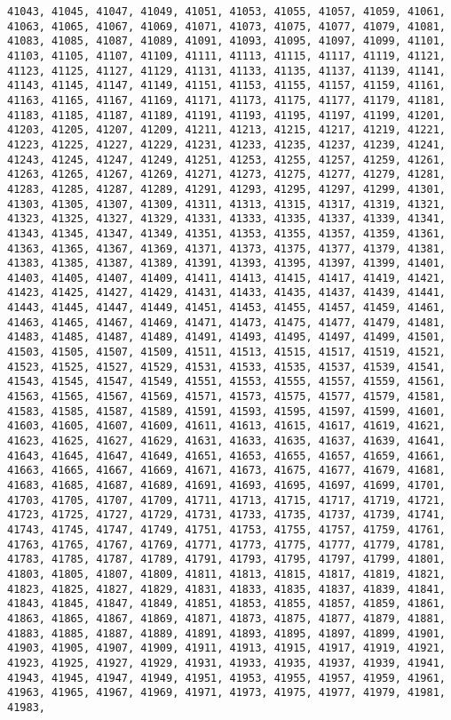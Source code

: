 \documentclass[11pt]{article}
\begin{document}
\begin{Verbatim}[commandchars=\\\{\}]
41043, 41045, 41047, 41049, 41051, 41053, 41055, 41057, 41059, 41061, 41063, 41065, 41067, 41069, 41071, 41073, 41075, 41077, 41079, 41081, 41083, 41085, 41087, 41089, 41091, 41093, 41095, 41097, 41099, 41101, 41103, 41105, 41107, 41109, 41111, 41113, 41115, 41117, 41119, 41121, 41123, 41125, 41127, 41129, 41131, 41133, 41135, 41137, 41139, 41141, 41143, 41145, 41147, 41149, 41151, 41153, 41155, 41157, 41159, 41161, 41163, 41165, 41167, 41169, 41171, 41173, 41175, 41177, 41179, 41181, 41183, 41185, 41187, 41189, 41191, 41193, 41195, 41197, 41199, 41201, 41203, 41205, 41207, 41209, 41211, 41213, 41215, 41217, 41219, 41221, 41223, 41225, 41227, 41229, 41231, 41233, 41235, 41237, 41239, 41241, 41243, 41245, 41247, 41249, 41251, 41253, 41255, 41257, 41259, 41261, 41263, 41265, 41267, 41269, 41271, 41273, 41275, 41277, 41279, 41281, 41283, 41285, 41287, 41289, 41291, 41293, 41295, 41297, 41299, 41301, 41303, 41305, 41307, 41309, 41311, 41313, 41315, 41317, 41319, 41321, 41323, 41325, 41327, 41329, 41331, 41333, 41335, 41337, 41339, 41341, 41343, 41345, 41347, 41349, 41351, 41353, 41355, 41357, 41359, 41361, 41363, 41365, 41367, 41369, 41371, 41373, 41375, 41377, 41379, 41381, 41383, 41385, 41387, 41389, 41391, 41393, 41395, 41397, 41399, 41401, 41403, 41405, 41407, 41409, 41411, 41413, 41415, 41417, 41419, 41421, 41423, 41425, 41427, 41429, 41431, 41433, 41435, 41437, 41439, 41441, 41443, 41445, 41447, 41449, 41451, 41453, 41455, 41457, 41459, 41461, 41463, 41465, 41467, 41469, 41471, 41473, 41475, 41477, 41479, 41481, 41483, 41485, 41487, 41489, 41491, 41493, 41495, 41497, 41499, 41501, 41503, 41505, 41507, 41509, 41511, 41513, 41515, 41517, 41519, 41521, 41523, 41525, 41527, 41529, 41531, 41533, 41535, 41537, 41539, 41541, 41543, 41545, 41547, 41549, 41551, 41553, 41555, 41557, 41559, 41561, 41563, 41565, 41567, 41569, 41571, 41573, 41575, 41577, 41579, 41581, 41583, 41585, 41587, 41589, 41591, 41593, 41595, 41597, 41599, 41601, 41603, 41605, 41607, 41609, 41611, 41613, 41615, 41617, 41619, 41621, 41623, 41625, 41627, 41629, 41631, 41633, 41635, 41637, 41639, 41641, 41643, 41645, 41647, 41649, 41651, 41653, 41655, 41657, 41659, 41661, 41663, 41665, 41667, 41669, 41671, 41673, 41675, 41677, 41679, 41681, 41683, 41685, 41687, 41689, 41691, 41693, 41695, 41697, 41699, 41701, 41703, 41705, 41707, 41709, 41711, 41713, 41715, 41717, 41719, 41721, 41723, 41725, 41727, 41729, 41731, 41733, 41735, 41737, 41739, 41741, 41743, 41745, 41747, 41749, 41751, 41753, 41755, 41757, 41759, 41761, 41763, 41765, 41767, 41769, 41771, 41773, 41775, 41777, 41779, 41781, 41783, 41785, 41787, 41789, 41791, 41793, 41795, 41797, 41799, 41801, 41803, 41805, 41807, 41809, 41811, 41813, 41815, 41817, 41819, 41821, 41823, 41825, 41827, 41829, 41831, 41833, 41835, 41837, 41839, 41841, 41843, 41845, 41847, 41849, 41851, 41853, 41855, 41857, 41859, 41861, 41863, 41865, 41867, 41869, 41871, 41873, 41875, 41877, 41879, 41881, 41883, 41885, 41887, 41889, 41891, 41893, 41895, 41897, 41899, 41901, 41903, 41905, 41907, 41909, 41911, 41913, 41915, 41917, 41919, 41921, 41923, 41925, 41927, 41929, 41931, 41933, 41935, 41937, 41939, 41941, 41943, 41945, 41947, 41949, 41951, 41953, 41955, 41957, 41959, 41961, 41963, 41965, 41967, 41969, 41971, 41973, 41975, 41977, 41979, 41981, 41983, 
\end{Verbatim}
\end{document}
